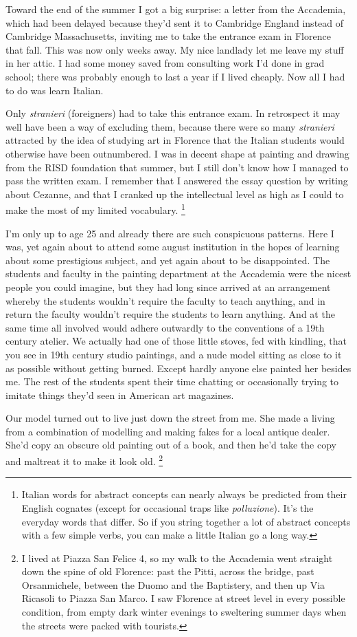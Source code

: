 Toward the end of the summer I got a big surprise: a letter from the
Accademia, which had been delayed because they'd sent it to Cambridge
England instead of Cambridge Massachusetts, inviting me to take the
entrance exam in Florence that fall. This was now only weeks away. My
nice landlady let me leave my stuff in her attic. I had some money saved
from consulting work I'd done in grad school; there was probably enough
to last a year if I lived cheaply. Now all I had to do was learn
Italian.

Only \emph{stranieri} (foreigners) had to take this entrance exam. In
retrospect it may well have been a way of excluding them, because there
were so many \emph{stranieri} attracted by the idea of studying art in
Florence that the Italian students would otherwise have been
outnumbered. I was in decent shape at painting and drawing from the RISD
foundation that summer, but I still don't know how I managed to pass the
written exam. I remember that I answered the essay question by writing
about Cezanne, and that I cranked up the intellectual level as high as I
could to make the most of my limited vocabulary. \footnote{Italian words for abstract concepts can nearly always be
predicted from their English cognates (except for occasional traps like
\emph{polluzione}). It's the everyday words that differ. So if you
string together a lot of abstract concepts with a few simple verbs, you
can make a little Italian go a long way.}

I'm only up to age 25 and already there are such conspicuous patterns.
Here I was, yet again about to attend some august institution in the
hopes of learning about some prestigious subject, and yet again about to
be disappointed. The students and faculty in the painting department at
the Accademia were the nicest people you could imagine, but they had
long since arrived at an arrangement whereby the students wouldn't
require the faculty to teach anything, and in return the faculty
wouldn't require the students to learn anything. And at the same time
all involved would adhere outwardly to the conventions of a 19th century
atelier. We actually had one of those little stoves, fed with kindling,
that you see in 19th century studio paintings, and a nude model sitting
as close to it as possible without getting burned. Except hardly anyone
else painted her besides me. The rest of the students spent their time
chatting or occasionally trying to imitate things they'd seen in
American art magazines.

Our model turned out to live just down the street from me. She made a
living from a combination of modelling and making fakes for a local
antique dealer. She'd copy an obscure old painting out of a book, and
then he'd take the copy and maltreat it to make it look old.
\footnote{I lived at Piazza San Felice 4, so my walk to the Accademia went
straight down the spine of old Florence: past the Pitti, across the
bridge, past Orsanmichele, between the Duomo and the Baptistery, and
then up Via Ricasoli to Piazza San Marco. I saw Florence at street level
in every possible condition, from empty dark winter evenings to
sweltering summer days when the streets were packed with tourists.}

